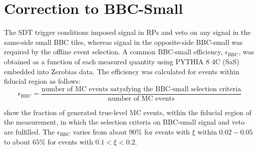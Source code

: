 \section{Correction to BBC-Small }\label{section:star_bbc}
The SDT trigger conditions imposed signal in RPs and veto on any signal in the same-side small BBC tiles, whereas signal in the opposite-side BBC-small was required by the offline event selection. A common BBC-small efficiency, $\epsilon_\textrm{BBC}$, was obtained as a function of each measured quantity using  PYTHIA 8 4C (SaS) embedded into Zerobias data. 
The efficiency was calculated  for events within fiducial region as follows:
\begin{equation}
\epsilon_\textrm{BBC}=\frac{\textrm{number of MC events satysfying the BBC-small selection criteria}}{\textrm{number of MC events}}
\end{equation}

 show the fraction of generated true-level MC events, within the fiducial region of the measurement, in which the selection criteria on BBC-small signal and veto are fulfilled. The $\epsilon_\textrm{BBC}$  varies from about $90\%$ for events with $\xi$ within $0.02-0.05$ to about $65\%$ for events with $0.1<\xi<0.2$.

